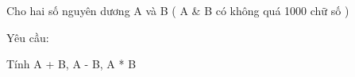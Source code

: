 Cho hai số nguyên dương A và B ( A \& B có không quá 1000 chữ số )  

   Yêu cầu:  

   Tính A + B, A - B, A * B